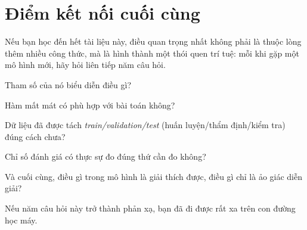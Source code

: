 \section*{Điểm kết nối cuối cùng}

Nếu bạn học đến hết tài liệu này, điều quan trọng nhất không phải là thuộc lòng thêm nhiều công thức, mà là hình thành một thói quen trí tuệ: mỗi khi gặp một mô hình mới, hãy hỏi liên tiếp năm câu hỏi.

Tham số của nó biểu diễn điều gì?

Hàm mất mát có phù hợp với bài toán không?

Dữ liệu đã được tách \emph{train/validation/test} (huấn luyện/thẩm định/kiểm tra) đúng cách chưa?

Chỉ số đánh giá có thực sự đo đúng thứ cần đo không?

Và cuối cùng, điều gì trong mô hình là giải thích được, điều gì chỉ là ảo giác diễn giải?

Nếu năm câu hỏi này trở thành phản xạ, bạn đã đi được rất xa trên con đường học máy.
